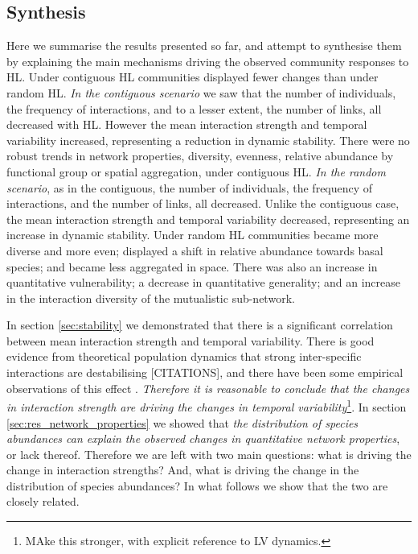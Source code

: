 \clearpage
\subsection{Synthesis}
\label{sec:res_synthesis}

Here we summarise the results presented so far, and attempt to synthesise them by explaining the main mechanisms driving the observed community responses to HL. Under contiguous HL communities displayed fewer changes than under random HL. \emph{In the contiguous scenario} we saw that the number of individuals,  the frequency of interactions, and to a lesser extent, the number of links, all decreased with HL. However the mean interaction strength and temporal variability increased, representing a reduction in dynamic stability. There were no robust trends in network properties, diversity, evenness, relative abundance by functional group or spatial aggregation, under contiguous HL. \emph{In the random scenario}, as in the contiguous, the number of individuals, the frequency of interactions, and the number of links, all decreased. Unlike the contiguous case, the mean interaction strength and temporal variability decreased, representing an increase in dynamic stability. Under random HL communities became more diverse and more even; displayed a shift in relative abundance towards basal species; and became less aggregated in space. There was also an increase in quantitative vulnerability; a decrease in quantitative generality; and an increase in the interaction diversity of the mutualistic sub-network.

In section \ref{sec:stability} we demonstrated that there is a significant correlation between mean interaction strength and temporal variability. There is good evidence from theoretical population dynamics that strong inter-specific interactions are destabilising [CITATIONS], and there have been some empirical observations of this effect \cite{o2009perturbations}. \emph{Therefore it is reasonable to conclude that the changes in interaction strength are driving the changes in temporal variability}\footnote{MAke this stronger, with explicit reference to LV dynamics.}. In section \ref{sec:res_network_properties} we showed that \emph{the distribution of species abundances can explain the observed changes in quantitative network properties}, or lack thereof. Therefore we are left with two main questions: what is driving the change in interaction strengths? And, what is driving the change in the distribution of species abundances? In what follows we show that the two are closely related.  


